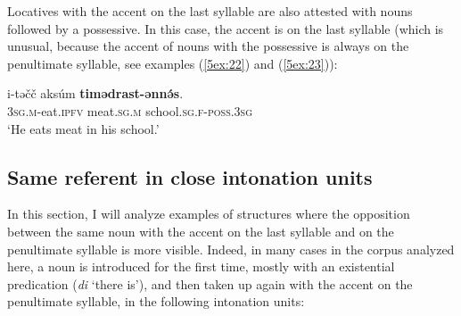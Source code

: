 \documentclass[output=paper]{langsci/langscibook}
\begin{document}
Locatives with the accent on the last syllable are also attested with nouns followed by a possessive. In this case, the accent is on the last syllable (which is unusual, because the accent of nouns with the possessive is always on the penultimate syllable, see examples (\ref{5ex:22}) and (\ref{5ex:23})):

\begin{exe}
\ex\label{5ex:41}
\gll	i-təčč	aksúm	{\textbf{timədrast-ənnə́s}}. \\
	{\textsc{3sg.m}}-eat.{\textsc{ipfv}}	meat.{\textsc{sg.m}}	school.{\textsc{sg.f-poss.3sg}} \\
\glt	`He eats meat in his school.'
\end{exe}


\subsection{Same referent in close intonation units}\label{5sec:25}

In this section, I will analyze examples of structures where the opposition between the same noun with the accent on the last syllable and on the penultimate syllable is more visible. Indeed, in many cases in the corpus analyzed here, a noun is introduced for the first time, mostly with an existential predication ({\emph{di}} `there is'), and then taken up again with the accent on the penultimate syllable, in the following intonation units:
\end{document}
